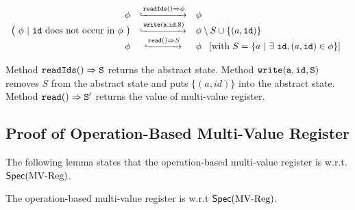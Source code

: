 \[
  \begin{array}{rcl}
    \abstate
    & \specarrow{\alabellong[\mathtt{readIds}]{}{\abstate}{}}
    & \abstate\\
    \big(\ \abstate\ |\ \mathtt{id}\ \text{does not occur in } \abstate\ \big)
             & \specarrow{ \alabelshort[{\tt write}]{a,id,S} }
    & \abstate \setminus S \cup \{ (a,\mathtt{id}) \}\\
    \abstate
    & \specarrow{\alabellong[\mathtt{read}]{}{ S }{}}
    & \abstate\
      \begin{array}{c}
        [\text{with}\ S = \{ a\ \vert\ \exists\ \mathtt{id}, (a,\mathtt{id}) \in \abstate \}]
      \end{array}
  \end{array}
\]

Method $\alabellong[{\tt readIds}]{}{S}{}$ returns the abstract state. Method $\alabelshort[{\tt write}]{a,id,S}$ removes $S$ from the abstract state and puts $\{ (a,id) \}$ into the abstract state. Method $\alabellong[{\tt read}]{}{S'}{}$ returns the value of multi-value register.



\subsection{Proof of Operation-Based Multi-Value Register}
\label{subsec:proof of operation-based multi-value register}

The following lemma states that the operation-based multi-value register is \crdtlinearizable{} w.r.t. $\mathsf{Spec}(\text{MV\text{-}Reg})$.

\begin{lemma}
\label{lemma:multi-value register is correct}
The operation-based multi-value register is \crdtlinearizable{} w.r.t $\mathsf{Spec}(\text{MV\text{-}Reg})$.
\end{lemma}

